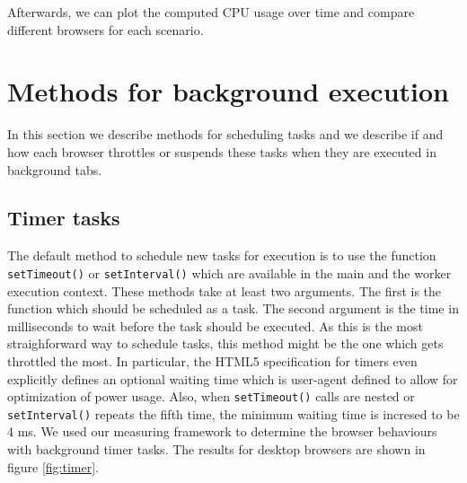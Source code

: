 \documentclass[
	ruledheaders=section,%
	class=report,%
	thesis={type=bachelor},%
	accentcolor=9c,%
	custommargins=true,%
	marginpar=false,%
	parskip=half-,%
	fontsize=11pt,%
]{tudapub}
\begin{document}
  Afterwards, we can plot the computed CPU usage over time and compare different browsers for each scenario.

  \section{Methods for background execution}

  In this section we describe methods for scheduling tasks and we describe if and how each browser throttles or suspends these tasks when they are executed in background tabs.
  
  \subsection{Timer tasks}
  \label{sec:timer-tasks}

  The default method to schedule new tasks for execution is to use the function \texttt{setTimeout()} or \texttt{setInterval()} which are available in the main and the worker execution context. These methods take at least two arguments. The first is the function which should be scheduled as a task. The second argument is the time in milliseconds to wait before the task should be executed. As this is the most straighforward way to schedule tasks, this method might be the one which gets throttled the most. In particular, the HTML5 specification for timers \cite{whatwg-timers} even explicitly defines an optional waiting time which is user-agent defined to allow for optimization of power usage. Also, when \texttt{setTimeout()} calls are nested or \texttt{setInterval()} repeats the fifth time, the minimum waiting time is incresed to be 4 ms. We used our measuring framework to determine the browser behaviours with background timer tasks. The results for desktop browsers are shown in figure \ref{fig:timer}.
\end{document}
